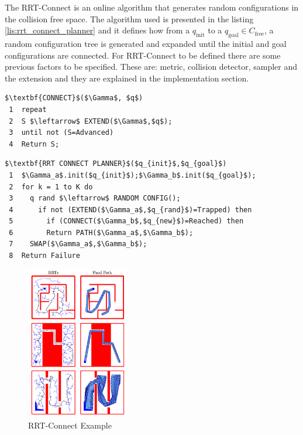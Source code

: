 The RRT-Connect is an online algorithm that generates random configurations in the collision free space.
The algorithm used is presented in the listing \ref{lis:rrt_connect_planner} and it defines how from a $q_{\mathrm{init}}$ to a $q_{\mathrm{goal}} \in C_{\mathrm{free}}$, a random configuration tree is generated and expanded until the initial and goal configurations are connected. For RRT-Connect to be defined there are some previous factors to be specified. These are: metric, collision detector, sampler and the extension and they are explained in the implementation section.

\begin{lstlisting}[frame=tb, mathescape=true, xleftmargin=.28\textwidth, xrightmargin=.28\textwidth,caption=RRT-Connect Algorithm, label=lis:rrt_connect_planner]
$\textbf{CONNECT}$($\Gamma$, $q$)
 1  repeat
 2  S $\leftarrow$ EXTEND($\Gamma$,$q$);
 3  until not (S=Advanced)
 4  Return S;
\end{lstlisting}
\lstset{}

\begin{lstlisting}[frame=tb, mathescape=true,xleftmargin=.13\textwidth, xrightmargin=.13\textwidth]
$\textbf{RRT CONNECT PLANNER}$($q_{init}$,$q_{goal}$)
 1  $\Gamma_a$.init($q_{init}$);$\Gamma_b$.init($q_{goal}$);
 2  for k = 1 to K do
 3    q rand $\leftarrow$ RANDOM CONFIG();
 4      if not (EXTEND($\Gamma_a$,$q_{rand}$)=Trapped) then
 5        if (CONNECT($\Gamma_b$,$q_{new}$)=Reached) then
 6        Return PATH($\Gamma_a$,$\Gamma_b$);
 7    SWAP($\Gamma_a$,$\Gamma_b$);
 8  Return Failure
\end{lstlisting}

\begin{figure}[htb]
	\centering
	\includegraphics[width=0.4\textwidth]{figures/rrt_connect}
	\caption{RRT-Connect Example}
	\label{fig:rrt_connect}
\end{figure}

